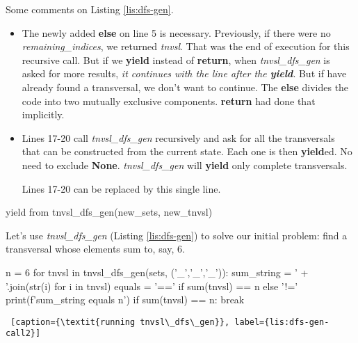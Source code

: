 \smallv
Some comments on Listing \ref{lis:dfs-gen}.  %
\begin{itemize}
    \item The newly added \textbf{else} on line 5 is necessary. Previously, if there were no \textit{remaining\_indices}, we returned \textit{tnvsl}. That was the end of execution for this recursive call. But if we \textbf{yield} instead of \textbf{return}, when \textit{tnvsl\_dfs\_gen} is asked for more results, \textit{it continues with the line after the \textbf{yield}}. But if have already found a transversal, we don't want to continue. The \textbf{else} divides the code into two mutually exclusive components. \textbf{return} had done that implicitly.
    
    \item Lines 17-20 call \textit{tnvsl\_dfs\_gen} recursively and ask for all the transversals that can be constructed from the current state. Each one is then \textbf{yield}ed. No need to exclude \textbf{None}. \textit{tnvsl\_dfs\_gen} will \textbf{yield} only complete transversals. 
    
    \smallv
Lines 17-20 can be replaced by this single line.
\end{itemize}
\begin{center}
\begin{minipage}[c]{0.45\textwidth}
\begin{python1}
    yield from tnvsl_dfs_gen(new_sets, new_tnvsl)
\end{python1}
\end{minipage}   
\end{center}

Let's use \textit{tnvsl\_dfs\_gen} (Listing \ref{lis:dfs-gen}) to solve our initial problem: find a transversal whose elements sum to, say, 6.

\begin{center}
\begin{minipage}[c]{0.45\textwidth}
\begin{python1}
n = 6
for tnvsl in tnvsl_dfs_gen(sets, ('_','_','_')):
  sum_string = ' + '.join(str(i) for i in tnvsl)
  equals = '==' if sum(tnvsl) == n else '!='
  print(f'{sum_string} {equals} {n}')
  if sum(tnvsl) == n: break
\end{python1}\linv
\begin{lstlisting} [caption={\textit{running tnvsl\_dfs\_gen}}, label={lis:dfs-gen-call2}]
\end{lstlisting}
\end{minipage}
\end{center}

